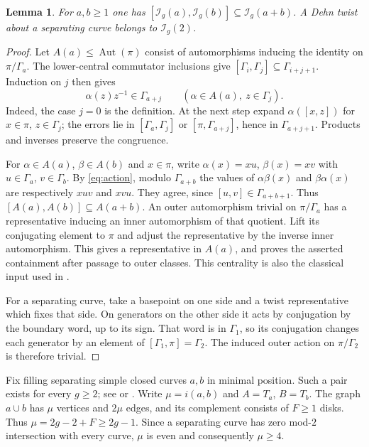 \documentclass[11pt]{article}
\newtheorem{lemma}[theorem]{Lemma}
\theoremstyle{remark}\newtheorem*{remark}{Remark}
\newcommand{\Aut}{\operatorname{Aut}}
\newcommand{\I}{\mathcal I}
\begin{document}
\begin{lemma}\label{lem:central}
For $a,b\ge1$ one has
$[\I_g(a),\I_g(b)]\subseteq\I_g(a+b)$.
A Dehn twist about a separating curve belongs to $\I_g(2)$.
\end{lemma}
\begin{proof}
Let $A(a)\le\Aut(\pi)$ consist of automorphisms inducing the identity on
$\pi/\Gamma_a$. The lower-central commutator inclusions give
$[\Gamma_i,\Gamma_j]\subseteq\Gamma_{i+j+1}$.
Induction on $j$ then gives
\begin{equation}\label{eq:action}
 \alpha(z)z^{-1}\in\Gamma_{a+j}
 \qquad(\alpha\in A(a),\ z\in\Gamma_j).
\end{equation}
Indeed, the case $j=0$ is the definition. At the next step expand
$\alpha([x,z])$ for $x\in\pi$, $z\in\Gamma_j$; the errors lie in
$[\Gamma_a,\Gamma_j]$ or $[\pi,\Gamma_{a+j}]$, hence in
$\Gamma_{a+j+1}$. Products and inverses preserve the congruence.

For $\alpha\in A(a)$, $\beta\in A(b)$ and $x\in\pi$, write
$\alpha(x)=xu$, $\beta(x)=xv$ with $u\in\Gamma_a$, $v\in\Gamma_b$.
By \eqref{eq:action}, modulo $\Gamma_{a+b}$ the values of
$\alpha\beta(x)$ and $\beta\alpha(x)$ are respectively $xuv$ and $xvu$.
They agree, since $[u,v]\in\Gamma_{a+b+1}$.
Thus $[A(a),A(b)]\subseteq A(a+b)$.
An outer automorphism trivial on $\pi/\Gamma_a$ has a representative
inducing an inner automorphism of that quotient. Lift its conjugating
element to $\pi$ and adjust the representative by the inverse inner
automorphism. This gives a representative in $A(a)$, and proves the
asserted containment after passage to outer classes. This centrality is
also the classical input used in \cite[proof of Proposition 4.8]{FLM}.

For a separating curve, take a basepoint on one side and a twist
representative which fixes that side. On generators on the other side
it acts by conjugation by the boundary word, up to its sign. That word
is in $\Gamma_1$, so its conjugation changes each generator by an element
of $[\Gamma_1,\pi]=\Gamma_2$. The induced outer action on
$\pi/\Gamma_2$ is therefore trivial.
\end{proof}

Fix filling separating simple closed curves $a,b$ in minimal position.
Such a pair exists for every $g\ge2$; see
\cite[\S7.2]{Farb} or \cite[Lemma 2.2]{AT}.
Write $\mu=i(a,b)$ and $A=T_a$, $B=T_b$.
The graph $a\cup b$ has $\mu$ vertices and $2\mu$ edges, and its
complement consists of $F\ge1$ disks. Thus
$\mu=2g-2+F\ge2g-1$. Since a separating curve has zero mod-$2$
intersection with every curve, $\mu$ is even and consequently $\mu\ge4$.
\end{document}
